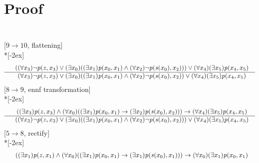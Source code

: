 \documentclass[fleqn]{article}
\newenvironment{VampireProof}{%
   \section{Proof}}{}
\newenvironment{VampireInference}{%
   \begin{array}{c}}{\end{array}}
\newenvironment{VampirePremise}%
   {\begin{array}{l}}%
   {\end{array}}
\newenvironment{VampireConclusion}%
   {\begin{array}{l}}%
   {\end{array}}
\newcommand{\VConclusionSeparator}{\\ \hline}
\newcommand{\Vor}{\vee}
\newcommand{\Vand}{\wedge}
\newcommand{\Vimp}{\rightarrow}
\begin{document}
\begin{VampireProof}
\[\begin{VampireInference}
\begin{VampireConclusion}
\end{VampireConclusion}
\end{VampireInference}
\]
[$9\rightarrow 10$, flattening]\\*[-2ex]
\[\begin{VampireInference}
\begin{VampirePremise}%
~~((\forall x_{3} )\neg \mathit{p} (\mathit{z},x_{3}) \Vor (\exists x_{0} )((\exists x_{1} )\mathit{p} (x_{0},x_{1}) \Vand (\forall x_{2} )\neg \mathit{p} (\mathit{s} (x_{0}),x_{2}))) \Vor (\forall x_{4} )(\exists x_{5} )\mathit{p} (x_{4},x_{5})
\end{VampirePremise}
\VConclusionSeparator
\begin{VampireConclusion}
~~(\forall x_{3} )\neg \mathit{p} (\mathit{z},x_{3}) \Vor (\exists x_{0} )((\exists x_{1} )\mathit{p} (x_{0},x_{1}) \Vand (\forall x_{2} )\neg \mathit{p} (\mathit{s} (x_{0}),x_{2})) \Vor (\forall x_{4} )(\exists x_{5} )\mathit{p} (x_{4},x_{5})
\end{VampireConclusion}
\end{VampireInference}
\]
[$8\rightarrow 9$, ennf transformation]\\*[-2ex]
\[\begin{VampireInference}
\begin{VampirePremise}%
~~((\exists x_{3} )\mathit{p} (\mathit{z},x_{3}) \Vand (\forall x_{0} )((\exists x_{1} )\mathit{p} (x_{0},x_{1}) \Vimp (\exists x_{2} )\mathit{p} (\mathit{s} (x_{0}),x_{2}))) \Vimp (\forall x_{4} )(\exists x_{5} )\mathit{p} (x_{4},x_{5})
\end{VampirePremise}
\VConclusionSeparator
\begin{VampireConclusion}
~~((\forall x_{3} )\neg \mathit{p} (\mathit{z},x_{3}) \Vor (\exists x_{0} )((\exists x_{1} )\mathit{p} (x_{0},x_{1}) \Vand (\forall x_{2} )\neg \mathit{p} (\mathit{s} (x_{0}),x_{2}))) \Vor (\forall x_{4} )(\exists x_{5} )\mathit{p} (x_{4},x_{5})
\end{VampireConclusion}
\end{VampireInference}
\]
[$5\rightarrow 8$, rectify]\\*[-2ex]
\[\begin{VampireInference}
\begin{VampirePremise}%
~~((\exists x_{1} )\mathit{p} (\mathit{z},x_{1}) \Vand (\forall x_{0} )((\exists x_{1} )\mathit{p} (x_{0},x_{1}) \Vimp (\exists x_{1} )\mathit{p} (\mathit{s} (x_{0}),x_{1}))) \Vimp (\forall x_{0} )(\exists x_{1} )\mathit{p} (x_{0},x_{1})
\end{VampirePremise}

\end{VampireInference}\]
\end{VampireProof}
\end{document}
